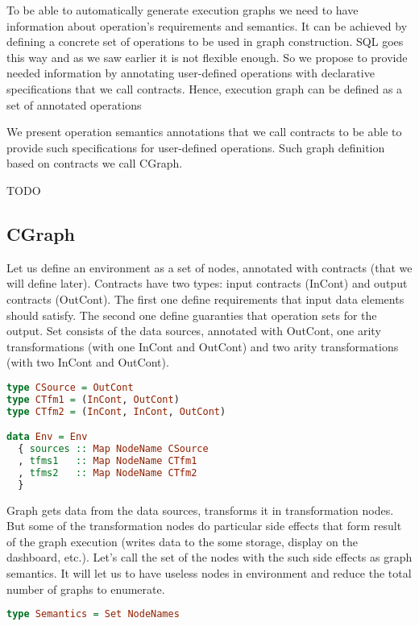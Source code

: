 To be able to automatically generate execution graphs we need to have information about operation's requirements and semantics.
It can be achieved by defining a concrete set of operations to be used in graph construction.
SQL goes this way and as we saw earlier it is not flexible enough.
So we propose to provide needed information by annotating user-defined operations with declarative specifications that we call contracts.
Hence, execution graph can be defined as a set of annotated operations

We present operation semantics annotations that we call contracts to be able to provide such specifications for user-defined operations.
Such graph definition based on contracts we call CGraph.

TODO

\subsection{CGraph}

Let us define an environment as a set of nodes, annotated with contracts (that we will define later).
Contracts have two types: input contracts (InCont) and output contracts (OutCont).
The first one define requirements that input data elements should satisfy.
The second one define guaranties that operation sets for the output.
Set consists of the data sources, annotated with OutCont, one arity transformations (with one InCont and OutCont) and two arity transformations (with two InCont and OutCont).

\begin{lstlisting}[language=Haskell]
type CSource = OutCont
type CTfm1 = (InCont, OutCont)
type CTfm2 = (InCont, InCont, OutCont)

data Env = Env
  { sources :: Map NodeName CSource
  , tfms1   :: Map NodeName CTfm1
  , tfms2   :: Map NodeName CTfm2
  }
\end{lstlisting}

Graph gets data from the data sources, transforms it in transformation nodes.
But some of the transformation nodes do particular side effects that form result of the graph execution (writes data to the some storage, display on the dashboard, etc.).
Let's call the set of the nodes with the such side effects as graph semantics.
It will let us to have useless nodes in environment and reduce the total number of graphs to enumerate.

\begin{lstlisting}[language=Haskell]
type Semantics = Set NodeNames
\end{lstlisting}

